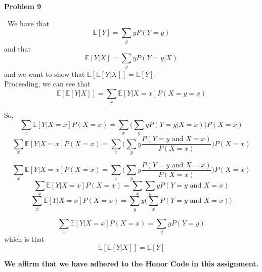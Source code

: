 \textbf{Problem 9}

\begin{solution}\ 
We have that 
\[\mathbb{E}[Y] = \sum_{y} yP(Y = y)\]
and that 
\[\mathbb{E}[Y|X] = \sum_y yP(Y = y | X)\]
and we want to show that $\mathbb{E}[\mathbb{E}[Y|X]] = \mathbb{E}[Y]$.\\
Proceeding, we can see that 
$$\mathbb{E}[\mathbb{E}[Y|X]] = \sum_x \mathbb{E}[Y | X = x]P(X = y=x)$$

So, 
$$\sum_x \mathbb{E}[Y | X = x]P(X = x) = \sum_x \bigg(\sum_y yP(Y = y | X =x)\bigg)P(X = x)$$
$$\sum_x \mathbb{E}[Y | X = x]P(X = x) = \sum_x \bigg(\sum_y y\frac{P(Y = y \text{ and } X =x)}{P(X =x )}\bigg)P(X = x)$$

$$\sum_x \mathbb{E}[Y | X = x]P(X = x) = \sum_x \bigg(\sum_y y\frac{P(Y = y \text{ and } X =x)}{P(X =x )}\bigg)P(X = x)$$
$$\sum_x \mathbb{E}[Y | X = x]P(X = x) = \sum_x \sum_y yP(Y = y \text{ and } X =x)$$
$$\sum_x \mathbb{E}[Y | X = x]P(X = x) = \sum_y y\bigg(\sum_x P(Y = y \text{ and } X =x)\bigg)$$

$$\sum_x \mathbb{E}[Y | X = x]P(X = x) = \sum_y yP(Y = y)$$
which is that 
\[\mathbb{E}[\mathbb{E}[Y|X]] = \mathbb{E}[Y]\]





\end{solution}

\textbf{We affirm that we have adhered to the Honor Code in this assignment.}